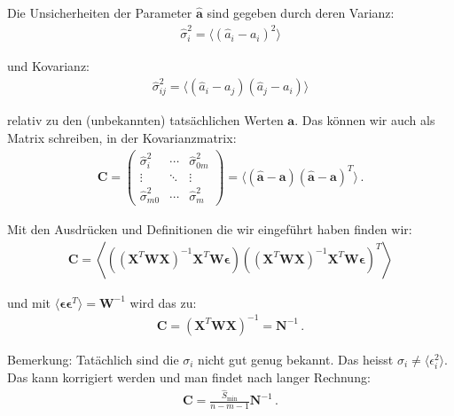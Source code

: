 Die Unsicherheiten der Parameter $\boldsymbol{\hat{a}}$ sind gegeben durch deren Varianz:
\begin{align}
\hat{\sigma}_i^2 = \langle ( \hat{a}_i - a_i )^2 \rangle
\label{eq:vl8-39}
\end{align}

und Kovarianz:
\begin{align}
\hat{\sigma}_{ij}^2 = \langle ( \hat{a}_i - a_j ) ( \hat{a}_j - a_i ) \rangle
\label{eq:vl8-40}
\end{align}

relativ zu den (unbekannten) tats\"achlichen Werten $\boldsymbol{a}$. Das k\"onnen wir auch als Matrix schreiben, in der Kovarianzmatrix:
\begin{align}
\boldsymbol{C} = 
\begin{pmatrix}
\hat{\sigma}_i^2  & \cdots & \hat{\sigma}_{0m}^2 \\
\vdots            & \ddots & \vdots            \\
\hat{\sigma}_{m0}^2 & \cdots & \hat{\sigma}_m^2  
\end{pmatrix}
= \langle ( \boldsymbol{\hat{a}} - \boldsymbol{a} )( \boldsymbol{\hat{a}} - \boldsymbol{a} )^T \rangle \,.
\label{eq:vl8-41}
\end{align}

Mit den Ausdr\"ucken und Definitionen die wir eingef\"uhrt haben finden wir:
\begin{align}
\boldsymbol{C} = \left\langle \left( ( \boldsymbol{X}^T \boldsymbol{WX} )^{-1} \boldsymbol{X}^T \boldsymbol{W \epsilon} \right) \left( ( \boldsymbol{X}^T \boldsymbol{WX} )^{-1} \boldsymbol{X}^T \boldsymbol{W \epsilon} \right)^T \right\rangle 
\label{eq:vl8-42}
\end{align}

und mit $\langle \boldsymbol{ \epsilon \epsilon}^T \rangle  = \boldsymbol{W}^{-1} $ wird das zu:
\begin{align}
\boldsymbol{C} = ( \boldsymbol{X}^T \boldsymbol{WX} )^{-1} = \boldsymbol{N}^{-1}\,.
\label{eq:vl8-43}
\end{align}

Bemerkung: Tat\"achlich sind die $\sigma_i$ nicht gut genug bekannt. Das heisst $\sigma_i \neq \langle \epsilon_i^2 \rangle$. Das kann korrigiert werden und man findet nach langer Rechnung:
\begin{align}
\boldsymbol{C} = \frac{ \hat{S}_\text{min} }{ n - m -1 } \boldsymbol{N}^{-1}\,.
\label{eq:vl8-44}
\end{align}


